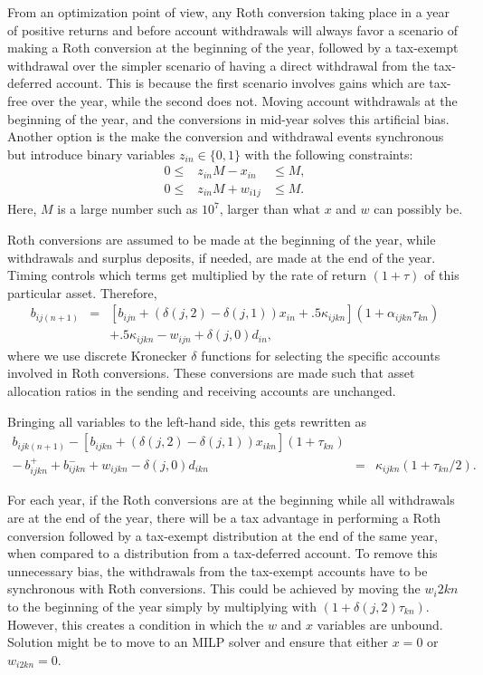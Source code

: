 \documentclass{article}[fleqn,12pt]
\begin{document}
	From an optimization point of view, any Roth conversion taking place
	in a year of positive returns and before account withdrawals will
	always favor a scenario of making
	a Roth conversion at the beginning of the year, followed
	by a tax-exempt withdrawal over the simpler scenario of having a direct
	withdrawal from the tax-deferred account. This is because the first
	scenario involves gains which are tax-free over the year, while
	the second does not. Moving account withdrawals at the beginning
	of the year, and the conversions in mid-year solves this artificial bias.
	Another option is the make the conversion and withdrawal events synchronous
	but introduce binary variables $z_{in} \in \{0, 1\}$ with the following constraints:
	\begin{eqnarray}
		0 \le& z_{in}M - x_{in} &\le M, \nonumber \\
		0 \le& z_{in}M + w_{i1j} &\le M.
	\end{eqnarray}
	Here, $M$ is a large number such as $10^7$, larger than what $x$ and $w$ can possibly be.

	Roth conversions are assumed to be made at the beginning of the year, while withdrawals
	and surplus deposits, if needed, are made at the end of the year.
	Timing controls which terms get multiplied by the rate of return $(1 + \tau)$
	of this particular asset.
	Therefore,
	\begin{eqnarray}
		\label{Eq:C3a}
		b_{ij(n+1)} &=& [b_{ijn} + (\delta(j, 2) - \delta(j, 1))x_{in} 
		+ .5\kappa_{ijkn}](1 + \alpha_{ijkn}\tau_{kn})
		\nonumber \\
		&& 
		+ .5 \kappa_{ijkn} 
		- w_{ijn} 
		+ \delta(j, 0)d_{in},
	\end{eqnarray}
	where we use discrete Kronecker $\delta$ functions for selecting the specific accounts involved
	in Roth conversions. These conversions are made such that asset allocation
	ratios in the sending and receiving accounts are unchanged.

	Bringing all variables
	to the left-hand side, this gets rewritten as
	\begin{eqnarray}
		\label{Eq:C3}
		b_{ijk(n+1)} - [b_{ijkn} + (\delta(j, 2) - \delta(j, 1))x_{ikn}](1 + \tau_{kn})
		&& \nonumber \\
		- \ b^+_{ijkn} + b^-_{ijkn} 
		+ w_{ijkn}
		- \delta(j, 0)d_{ikn} 
		&=& \kappa_{ijkn} \left(1 + \tau_{kn}/2\right).
	\end{eqnarray}

	For each year, if the Roth conversions are at the beginning while all 
	withdrawals are at the end of the year, there will be a tax advantage in performing a Roth
	conversion followed by a tax-exempt distribution
	at the end of the same year, when compared to a distribution from a tax-deferred
	account. To remove this unnecessary bias, the withdrawals
	from the tax-exempt accounts have to be synchronous with Roth conversions.
	This could be achieved by moving the $w_i2kn$ to the beginning of the year simply
	by multiplying with $(1 + \delta(j, 2)\tau_{kn})$. However, this creates
	a condition in which the $w$ and $x$ variables are unbound. Solution might
	be to move to an MILP solver and ensure that either $x=0$ or $w_{i2kn} = 0$.
\end{document}

